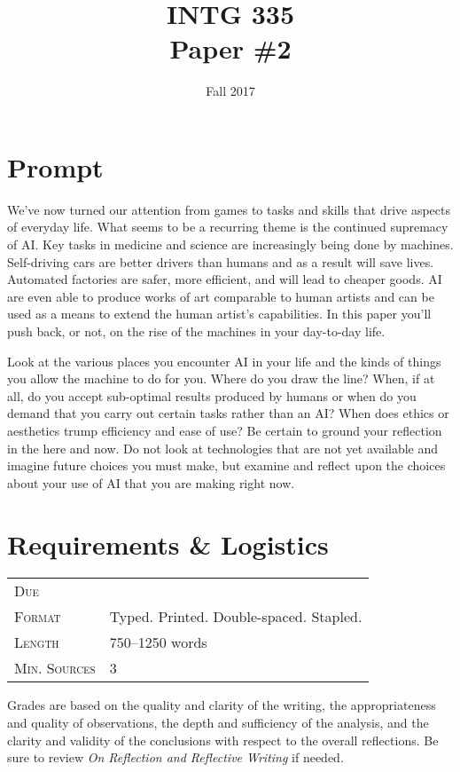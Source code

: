 \documentclass[nobib]{tufte-handout}
\title{INTG 335 \\ Paper \#2 }
\date{ Fall 2017 }
\begin{document}
\maketitle

\section{Prompt}

We've now turned our attention from games to tasks and skills that drive aspects of everyday life. What seems to be a recurring theme is the continued supremacy of AI\@. Key tasks in medicine and science are increasingly being done by machines. Self-driving cars are better drivers than humans and as a result will save lives. Automated factories are safer, more efficient, and will lead to cheaper goods. AI are even able to produce works of art comparable to human artists and can be used as a means to extend the human artist's capabilities. In this paper you'll push back, or not, on the rise of the machines in your day-to-day life.

Look at the various places you encounter AI in your life and the kinds of things you allow the machine to do for you. Where do you draw the line? When, if at all, do you accept sub-optimal results produced by humans or when do you demand that you carry out certain tasks rather than an AI\@? When does ethics or aesthetics trump efficiency and ease of use? Be certain to ground your reflection in the here and now. Do not look at technologies that are not yet available and imagine future choices you must make, but examine and reflect upon the choices about your use of AI that you are making right now. 

\section{Requirements \& Logistics}

\begin{tabular}{ll}
\textsc{Due} &  \\
\textsc{Format} & Typed. Printed. Double-spaced. Stapled. \\
\textsc{Length} & 750--1250 words \\
\textsc{Min. Sources} & 3
\end{tabular}
\vspace{.25in}

Grades are based on the quality and clarity of the writing, the appropriateness and quality of observations, the depth and sufficiency of the analysis, and the clarity and validity of the conclusions with respect to the overall reflections. Be sure to review \textit{On Reflection and Reflective Writing} if needed.
\end{document}
